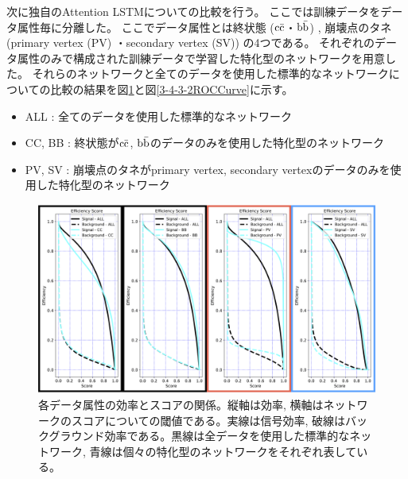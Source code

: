 次に独自のAttention LSTMについての比較を行う。
ここでは訓練データをデータ属性毎に分離した。
ここでデータ属性とは終状態 ($\rm c\bar{c}$・$\rm b\bar{b}$) , 崩壊点のタネ (primary vertex (PV) ・secondary vertex (SV)) の4つである。
それぞれのデータ属性のみで構成された訓練データで学習した特化型のネットワークを用意した。
それらのネットワークと全てのデータを使用した標準的なネットワークについての比較の結果を図\ref{3-4-3-2EfficiencyCurve}と図\ref{3-4-3-2ROCCurve}に示す。

\begin{itemize}
 \item ALL : 全てのデータを使用した標準的なネットワーク
 \item CC, BB : 終状態が$\rm c\bar{c}$, $\rm b\bar{b}$のデータのみを使用した特化型のネットワーク
 \item PV, SV : 崩壊点のタネがprimary vertex, secondary vertexのデータのみを使用した特化型のネットワーク
\end{itemize}

\begin{figure}[htbp]
 \centering
 \includegraphics[width=1.0\textwidth, clip]{Figure/3Networks/3-4-3-2EfficiencyCurve.png}
 \caption[各データ属性の効率とスコアの関係]{各データ属性の効率とスコアの関係。縦軸は効率, 横軸はネットワークのスコアについての閾値である。実線は信号効率, 破線はバックグラウンド効率である。黒線は全データを使用した標準的なネットワーク, 青線は個々の特化型のネットワークをそれぞれ表している。}
 \label{3-4-3-2EfficiencyCurve}
\end{figure}

